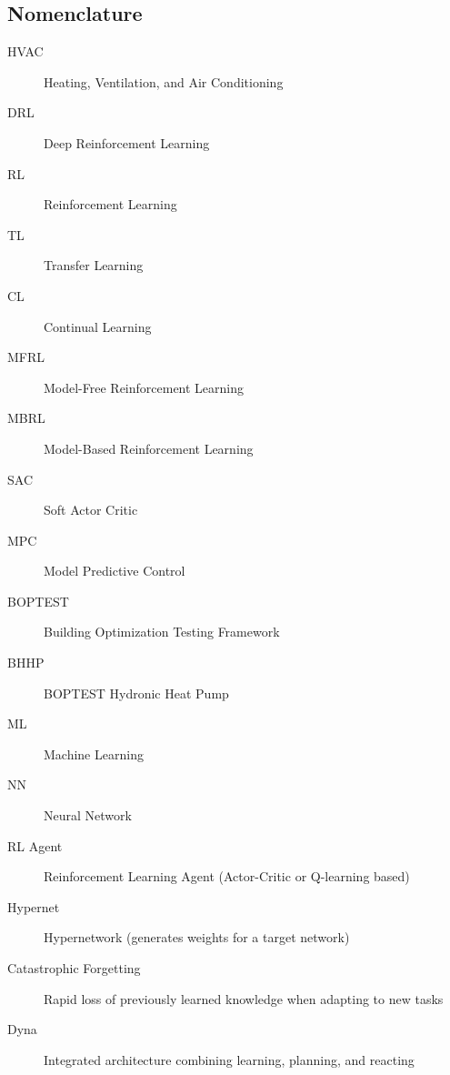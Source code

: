 

\subsection*{Nomenclature}
\begin{description}
  \item[HVAC] Heating, Ventilation, and Air Conditioning
  \item[DRL] Deep Reinforcement Learning
  \item[RL] Reinforcement Learning
  \item[TL] Transfer Learning
  \item[CL] Continual Learning
  \item[MFRL] Model-Free Reinforcement Learning
  \item[MBRL] Model-Based Reinforcement Learning
  \item[SAC] Soft Actor Critic
  \item[MPC] Model Predictive Control
  \item[BOPTEST] Building Optimization Testing Framework
  \item[BHHP] BOPTEST Hydronic Heat Pump
  \item[ML] Machine Learning
  \item[NN] Neural Network
  \item[RL Agent] Reinforcement Learning Agent (Actor-Critic or Q-learning based)
  \item[Hypernet] Hypernetwork (generates weights for a target network)
  \item[Catastrophic Forgetting] Rapid loss of previously learned knowledge when adapting to new tasks
  \item[Dyna] Integrated architecture combining learning, planning, and reacting
\end{description}


